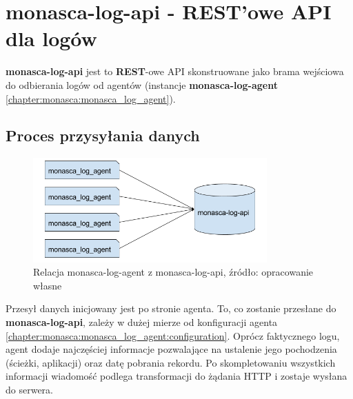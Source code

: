 \section{monasca-log-api - REST'owe API dla logów}
\label{chapter:monasca:monasca_log_api}

\textbf{monasca-log-api} jest to \textbf{REST}-owe API skonstruowane jako
brama wejściowa do odbierania logów od agentów (instancje \textbf{monasca-log-agent}
\ref{chapter:monasca:monasca_log_agent}).
    
    \subsection{Proces przysyłania danych}
    \begin{figure}[H]
        \centering
        \includegraphics[width=0.80\textwidth]{images/monasca_log_api_data_flow}
        \caption[Relacja monasca-log-agent z monasca-log-api]{
            Relacja monasca-log-agent z monasca-log-api, źródło: opracowanie własne
        }
        \label{chapter:monasca:monasca_log_api:data_flow}
    \end{figure}
    Przesył danych inicjowany jest po stronie agenta. To, co zostanie przesłane
    do \textbf{monasca-log-api}, zależy w dużej mierze od konfiguracji agenta 
    \ref{chapter:monasca:monasca_log_agent:configuration}. Oprócz faktycznego
    logu, agent dodaje najczęściej informacje pozwalające na ustalenie jego pochodzenia (ścieżki, aplikacji) oraz
    datę pobrania rekordu. Po skompletowaniu wszystkich informacji wiadomość podlega
    transformacji do żądania HTTP i zostaje wysłana do serwera.
    
